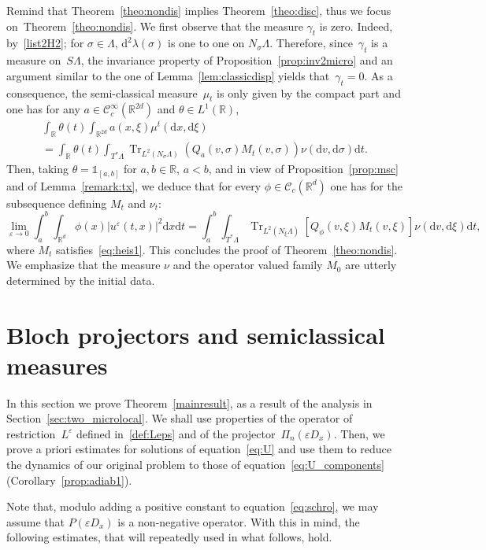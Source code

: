 \documentclass[10pt]{amsart}
\theoremstyle{definition}
\DeclareMathOperator{\Trr}{Tr}
\newcommand*\R{{\mathbb R}}
\newcommand*\eps{\varepsilon}
\numberwithin{equation}{section}
\newcommand*{\dd}{\mathrm{d}}
\newcommand*{\dt}{\dd t}
\newcommand*{\dx}{\dd x}
\newcommand*{\dv}{\dd v}
\newcommand*{\dxi}{\dd \xi}
\begin{document}
Remind that Theorem~\ref{theo:nondis} implies Theorem~\ref{theo:disc}, thus we focus on~Theorem~\ref{theo:nondis}. We first observe that the measure $\gamma_t$ is zero. Indeed, by~\eqref{list2H2}; for $\sigma\in\Lambda$, $\dd^2\lambda(\sigma)$ is one to one on $N_\sigma\Lambda$. Therefore, since~$\gamma_t$ is a measure on~$S\Lambda$, the invariance property of Proposition~\ref{prop:inv2micro} and an argument similar to the one of Lemma~\ref{lem:classicdisp} yields that~$\gamma_t=0$. As a consequence, the semi-classical measure~$\mu_t$ is only given by the compact part and one has for any $a\in{\mathcal C}_c^\infty(\R^{2d})$ and $\theta\in L^1(\R)$,
\begin{multline*}
\int_\R \theta(t)\int_{\R^{2d} }a(x,\xi) \mu^t(\dx,\dxi)\\
=\int_\R \theta(t) \int_{T^* \Lambda} {\Trr}_{L^2(N_\sigma\Lambda)}(Q_a(v,\sigma)M_t(v, \sigma))\nu (\mathrm{d}v,\mathrm{d}\sigma)\mathrm{d}t.
\end{multline*}
Then, taking $\theta=\mathds{1}_{[a,b]}$ for $a,b\in\R$, $a<b$, and in view of Proposition~\ref{prop:msc} and of Lemma~\ref{remark:tx}, we deduce that for every $\phi\in \mathcal{C}_c(\R^d)$ one has for the subsequence defining $M_t$ and $\nu_t$:
\[
\lim_{\eps\rightarrow 0}\int_a^b\int_{\R^d}\phi(x)|u^{\eps}(t,x)|^2\dx\dt=\int_a^b \int_{T^*\Lambda}\Trr_{L^2(N_\xi\Lambda)}\left[Q_\phi(v,\xi)M_t(v,\xi)\right]\nu(\dv,\dxi)\dt,
\]
where $M_t$ satisfies~\eqref{eq:heis1}. This concludes the proof of Theorem~\ref{theo:nondis}. We emphasize that the measure $\nu$ and the operator valued family $M_0$ are utterly determined by the initial data.



\section{Bloch projectors and semiclassical measures}\label{sec:5}

In this section we prove Theorem~\ref{mainresult}, as a result of the analysis in Section~\ref{sec:two_microlocal}. We shall use properties of the operator of restriction~$L^\eps$ defined in~\eqref{def:Leps} and of the projector~$\Pi_n(\eps D_x)$. Then, we prove a priori estimates for solutions of equation~\eqref{eq:U} and use them to reduce the dynamics of our original problem to those of equation~\eqref{eq:U_components} (Corollary~\ref{prop:adiab1}).



Note that, modulo adding a positive constant to equation~\eqref{eq:schro}, we may assume that $P(\eps D_x)$ is a non-negative operator. With this in mind, the following estimates, that will repeatedly used in what follows, hold.
\end{document}
